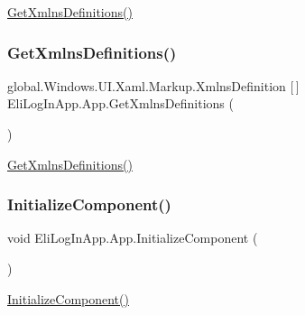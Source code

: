 \hyperlink{class_eli_log_in_app_1_1_app_a1bb4d4a1609ef93a317c8d25a87d2d0c}{Get\+Xmlns\+Definitions()} 

\mbox{\label{class_eli_log_in_app_1_1_app_a1bb4d4a1609ef93a317c8d25a87d2d0c}} 
\subsubsection{\texorpdfstring{Get\+Xmlns\+Definitions()}{GetXmlnsDefinitions()}\hspace{0.1cm}{\footnotesize\ttfamily [3/3]}}
{\footnotesize\ttfamily global.\+Windows.\+U\+I.\+Xaml.\+Markup.\+Xmlns\+Definition \mbox{[}$\,$\mbox{]} Eli\+Log\+In\+App.\+App.\+Get\+Xmlns\+Definitions (\begin{DoxyParamCaption}{ }\end{DoxyParamCaption})\hspace{0.3cm}{\ttfamily [inline]}}



\hyperlink{class_eli_log_in_app_1_1_app_a1bb4d4a1609ef93a317c8d25a87d2d0c}{Get\+Xmlns\+Definitions()} 

\mbox{\label{class_eli_log_in_app_1_1_app_a7222ec608fb118a2f169e98168591be3}} 
\subsubsection{\texorpdfstring{Initialize\+Component()}{InitializeComponent()}\hspace{0.1cm}{\footnotesize\ttfamily [1/3]}}
{\footnotesize\ttfamily void Eli\+Log\+In\+App.\+App.\+Initialize\+Component (\begin{DoxyParamCaption}{ }\end{DoxyParamCaption})\hspace{0.3cm}{\ttfamily [inline]}}



\hyperlink{class_eli_log_in_app_1_1_app_a7222ec608fb118a2f169e98168591be3}{Initialize\+Component()} 

